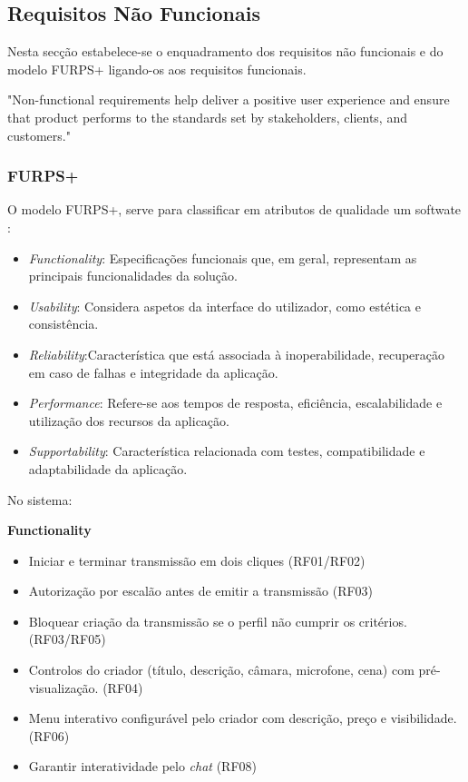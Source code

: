 \subsection{Requisitos Não Funcionais}

Nesta secção estabelece-se o enquadramento dos requisitos não funcionais e do modelo FURPS+ ligando-os aos requisitos funcionais.

"Non-functional requirements help deliver a positive user experience and
ensure that product performs to the standards set by stakeholders, clients, and customers."\cite{Rashid2024FURPSMoSCoW}




\subsubsection{FURPS+}

O modelo \gls{FURPS+}, serve para classificar em atributos de qualidade um softwate \cite{Rashid2024FURPSMoSCoW}:

\begin{itemize}
  \item \textit{Functionality}: Especificações funcionais que, em geral, representam as principais funcionalidades da solução.
  \item \textit{Usability}: Considera aspetos da interface do utilizador, como estética e consistência.
  \item \textit{Reliability}:Característica que está associada à inoperabilidade, recuperação em caso de falhas e integridade da aplicação.
  \item \textit{Performance}: Refere-se aos tempos de resposta, eficiência, escalabilidade e utilização
dos recursos da aplicação.
  \item \textit{Supportability}: Característica relacionada com testes, compatibilidade e adaptabilidade da aplicação. 
\end{itemize}

No sistema:

\noindent\textbf{Functionality}
\begin{itemize}
  \item Iniciar e terminar transmissão em dois cliques (RF01/RF02)
  \item Autorização por escalão antes de emitir a transmissão (RF03)
  \item Bloquear criação da transmissão se o perfil não cumprir os critérios. (RF03/RF05)
  \item Controlos do criador (título, descrição, câmara, microfone, cena) com pré-visualização. (RF04)
  \item Menu interativo configurável pelo criador com descrição, preço e visibilidade. (RF06)
  \item Garantir interatividade pelo \textit{chat} (RF08)
\end{itemize}

